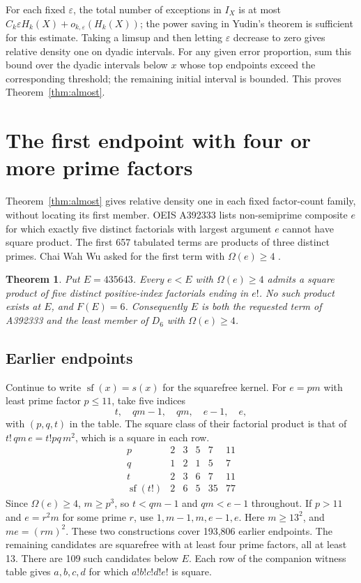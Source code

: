 \documentclass[10pt,letterpaper]{article}
\newtheorem{theorem}{Theorem}
\newcommand{\K}{\operatorname{sf}}
\begin{document}
For each fixed \(\varepsilon\), the total number of exceptions in \(I_X\) is at most \(C_k\varepsilon H_k(X)+o_{k,\varepsilon}(H_k(X))\); the power saving in Yudin's theorem is sufficient for this estimate. Taking a limsup and then letting \(\varepsilon\) decrease to zero gives relative density one on dyadic intervals. For any given error proportion, sum this bound over the dyadic intervals below \(x\) whose top endpoints exceed the corresponding threshold; the remaining initial interval is bounded. This proves Theorem~\ref{thm:almost}.

\section{The first endpoint with four or more prime factors}

Theorem~\ref{thm:almost} gives relative density one in each fixed factor-count family, without locating its first member. OEIS A392333 lists non-semiprime composite \(e\) for which exactly five distinct factorials with largest argument \(e\) cannot have square product. The first 657 tabulated terms are products of three distinct primes. Chai Wah Wu asked for the first term with \(\Omega(e)\ge4\) \cite{oeis}.

\begin{theorem}
Put \(E=435643\). Every \(e<E\) with \(\Omega(e)\ge4\) admits a square product of five distinct positive-index factorials ending in \(e!\). No such product exists at \(E\), and \(F(E)=6\). Consequently \(E\) is both the requested term of A392333 and the least member of \(D_6\) with \(\Omega(e)\ge4\).
\end{theorem}

\subsection{Earlier endpoints}

Continue to write \(\K(x)=s(x)\) for the squarefree kernel. For \(e=pm\) with least prime factor \(p\le11\), take five indices
\[
 t,\quad qm-1,\quad qm,\quad e-1,\quad e,
\]
with \((p,q,t)\) in the table. The square class of their factorial product is that of \(t!\,qm\,e=t!pq\,m^2\), which is a square in each row.
\[
\begin{array}{c|rrrrr}
p & 2&3&5&7&11\\
q & 1&2&1&5&7\\
t & 2&3&6&7&11\\
\K(t!) &2&6&5&35&77
\end{array}
\]
Since \(\Omega(e)\ge4\), \(m\ge p^3\), so \(t<qm-1\) and \(qm<e-1\) throughout. If \(p>11\) and \(e=r^2m\) for some prime \(r\), use \(1,m-1,m,e-1,e\). Here \(m\ge13^2\), and \(me=(rm)^2\). These two constructions cover 193,806 earlier endpoints. The remaining candidates are squarefree with at least four prime factors, all at least 13. There are 109 such candidates below \(E\). Each row of the companion witness table gives \(a,b,c,d\) for which \(a!b!c!d!e!\) is square.
\end{document}
